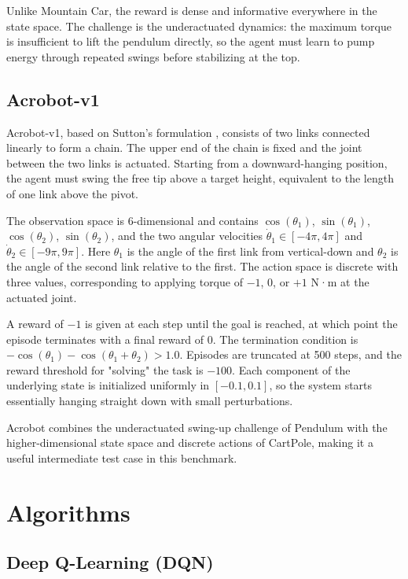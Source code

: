 \documentclass{article}
\begin{document}
Unlike Mountain Car, the reward is dense and informative everywhere in the state space. The challenge is the underactuated dynamics: the maximum torque is insufficient to lift the pendulum directly, so the agent must learn to pump energy through repeated swings before stabilizing at the top.

\subsection{Acrobot-v1}
Acrobot-v1, based on Sutton's formulation \citep{sutton1996generalization}, consists of two links connected linearly to form a chain. The upper end of the chain is fixed and the joint between the two links is actuated. Starting from a downward-hanging position, the agent must swing the free tip above a target height, equivalent to the length of one link above the pivot.

The observation space is 6-dimensional and contains $\cos(\theta_1)$, $\sin(\theta_1)$, $\cos(\theta_2)$, $\sin(\theta_2)$, and the two angular velocities $\dot{\theta}_1 \in [-4\pi, 4\pi]$ and $\dot{\theta}_2 \in [-9\pi, 9\pi]$. Here $\theta_1$ is the angle of the first link from vertical-down and $\theta_2$ is the angle of the second link relative to the first. The action space is discrete with three values, corresponding to applying torque of $-1$, $0$, or $+1$ N·m at the actuated joint.

A reward of $-1$ is given at each step until the goal is reached, at which point the episode terminates with a final reward of $0$. The termination condition is $-\cos(\theta_1) - \cos(\theta_1 + \theta_2) > 1.0$. Episodes are truncated at 500 steps, and the reward threshold for "solving" the task is $-100$. Each component of the underlying state is initialized uniformly in $[-0.1, 0.1]$, so the system starts essentially hanging straight down with small perturbations.

Acrobot combines the underactuated swing-up challenge of Pendulum with the higher-dimensional state space and discrete actions of CartPole, making it a useful intermediate test case in this benchmark.

\section{Algorithms}
\subsection{Deep Q-Learning (DQN)}
\end{document}
